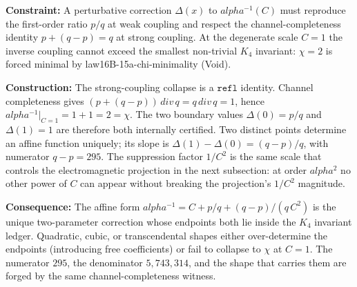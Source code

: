 \documentclass[11pt,a4paper]{book}
\def\alpha{alpha}%
\def\mathrm#1{#1}%
\def\texttt#1{#1}%
\begin{document}
\textbf{Constraint:} A perturbative correction $\Delta(x)$ to $\alpha^{-1}(C)$
must reproduce the first-order ratio $p/q$ at weak coupling and respect the
channel-completeness identity $p + (q-p) = q$ at strong coupling. At the
degenerate scale $C = 1$ the inverse coupling cannot exceed the smallest
non-trivial $K_4$ invariant: $\chi = 2$ is forced minimal by
\texttt{law16B-15a-chi-minimality} (Void).

\textbf{Construction:} The strong-coupling collapse is a $\mathtt{refl}$
identity. Channel completeness gives
$(p + (q-p))\,\mathrm{div}\,q = q\,\mathrm{div}\,q = 1$, hence
$\alpha^{-1}|_{C=1} = 1 + 1 = 2 = \chi$. The two boundary values
$\Delta(0) = p/q$ and $\Delta(1) = 1$ are therefore both internally certified.
Two distinct points determine an affine function uniquely; its slope is
$\Delta(1) - \Delta(0) = (q-p)/q$, with numerator $q - p = 295$. The
suppression factor $1/C^{2}$ is the same scale that controls the
electromagnetic projection in the next subsection: at order $\alpha^{2}$
no other power of $C$ can appear without breaking the projection's
$1/C^{2}$ magnitude.

\textbf{Consequence:} The affine form
$\alpha^{-1} = C + p/q + (q-p)/(q\,C^{2})$ is the unique two-parameter
correction whose endpoints both lie inside the $K_4$ invariant ledger.
Quadratic, cubic, or transcendental shapes either over-determine the
endpoints (introducing free coefficients) or fail to collapse to $\chi$ at
$C = 1$. The numerator $295$, the denominator $5{,}743{,}314$, and the shape
that carries them are forged by the same channel-completeness witness.
\end{document}
